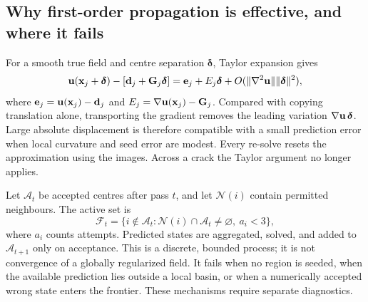 \subsection{Why first-order propagation is effective, and where it fails}
For a smooth true field and centre separation $\boldsymbol\delta$, Taylor expansion gives
\begin{equation}
\mathbf u(\mathbf x_j+\boldsymbol\delta)-[\mathbf d_j+\mathbf G_j\boldsymbol\delta]
=\mathbf e_j+E_j\boldsymbol\delta+O(\|\nabla^2\mathbf u\|\|\boldsymbol\delta\|^2),
\end{equation}
where $\mathbf e_j=\mathbf u(\mathbf x_j)-\mathbf d_j$ and $E_j=\nabla\mathbf u(\mathbf x_j)-\mathbf G_j$. Compared with copying translation alone, transporting the gradient removes the leading variation $\nabla\mathbf u\,\boldsymbol\delta$. Large absolute displacement is therefore compatible with a small prediction error when local curvature and seed error are modest. Every re-solve resets the approximation using the images. Across a crack the Taylor argument no longer applies.

Let $\mathcal A_t$ be accepted centres after pass $t$, and let $\mathcal N(i)$ contain permitted neighbours. The active set is
\begin{equation}
\mathcal F_t=\{i\notin\mathcal A_t:\mathcal N(i)\cap\mathcal A_t\ne\varnothing,\ a_i<3\},
\end{equation}
where $a_i$ counts attempts. Predicted states are aggregated, solved, and added to $\mathcal A_{t+1}$ only on acceptance. This is a discrete, bounded process; it is not convergence of a globally regularized field. It fails when no region is seeded, when the available prediction lies outside a local basin, or when a numerically accepted wrong state enters the frontier. These mechanisms require separate diagnostics.
